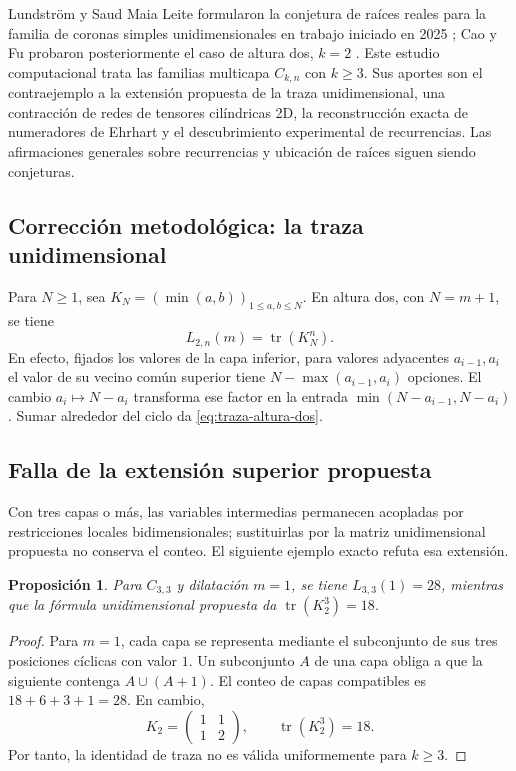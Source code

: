\documentclass[11pt,a4paper]{article}
\newtheorem{proposition}[theorem]{Proposición}
\theoremstyle{definition}
\begin{document}
Lundström y Saud Maia Leite formularon la conjetura de raíces reales para la familia de coronas simples unidimensionales en trabajo iniciado en 2025 \cite{LundstromLeite2026}; Cao y Fu probaron posteriormente el caso de altura dos, $k=2$ \cite{CaoFu2026}. Este estudio computacional trata las familias multicapa $C_{k,n}$ con $k\ge3$. Sus aportes son el contraejemplo a la extensión propuesta de la traza unidimensional, una contracción de redes de tensores cilíndricas 2D, la reconstrucción exacta de numeradores de Ehrhart y el descubrimiento experimental de recurrencias. Las afirmaciones generales sobre recurrencias y ubicación de raíces siguen siendo conjeturas.

\subsection{Corrección metodológica: la traza unidimensional}

Para $N\ge1$, sea $K_N=(\min(a,b))_{1\le a,b\le N}$. En altura dos, con $N=m+1$, se tiene
\begin{equation}\label{eq:traza-altura-dos}
L_{2,n}(m)=\operatorname{tr}(K_N^n).
\end{equation}
En efecto, fijados los valores de la capa inferior, para valores adyacentes $a_{i-1},a_i$ el valor de su vecino común superior tiene $N-\max(a_{i-1},a_i)$ opciones. El cambio $a_i\mapsto N-a_i$ transforma ese factor en la entrada $\min(N-a_{i-1},N-a_i)$. Sumar alrededor del ciclo da \eqref{eq:traza-altura-dos}.

\subsection{Falla de la extensión superior propuesta}

Con tres capas o más, las variables intermedias permanecen acopladas por restricciones locales bidimensionales; sustituirlas por la matriz unidimensional propuesta no conserva el conteo. El siguiente ejemplo exacto refuta esa extensión.

\begin{proposition}\label{prop:contraejemplo}
Para $C_{3,3}$ y dilatación $m=1$, se tiene $L_{3,3}(1)=28$, mientras que la fórmula unidimensional propuesta da $\operatorname{tr}(K_2^3)=18$.
\end{proposition}

\begin{proof}
Para $m=1$, cada capa se representa mediante el subconjunto de sus tres posiciones cíclicas con valor $1$. Un subconjunto $A$ de una capa obliga a que la siguiente contenga $A\cup(A+1)$. El conteo de capas compatibles es $18+6+3+1=28$. En cambio,
\[
K_2=\begin{pmatrix}1&1\\1&2\end{pmatrix},
\qquad \operatorname{tr}(K_2^3)=18.
\]
Por tanto, la identidad de traza no es válida uniformemente para $k\ge3$.
\end{proof}
\end{document}
